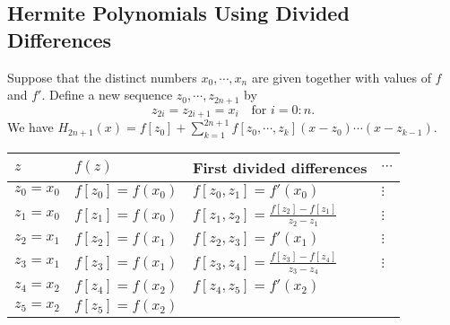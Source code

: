 \subsection{Hermite Polynomials Using Divided Differences}
Suppose that the distinct numbers $x_0,\cdots,x_n$ are given together with values of $f$ and $f'$. Define a new sequence $z_0,\cdots,z_{2n+1}$ by
\[
z_{2i} = z_{2i+1} = x_i\quad\text{for $i=0:n$}.
\]
We have $H_{2n+1}(x)=f[z_0]+\sum_{k=1}^{2n+1}f[z_0,\cdots,z_k](x-z_0)\cdots(x-z_{k-1})$.
\vspace{1cm}\\
\begin{tabular}{@{}llll@{}}
\toprule
$z$ & $f(z)$ & First divided differences & $\cdots$ \\ \midrule
$z_0=x_0$ & $f[z_0]=f(x_0)$ & $f[z_0,z_1]=f'(x_0)$ & $\vdots$ \\
$z_1=x_0$ & $f[z_1]=f(x_0)$ & $f[z_1,z_2]=\frac{f[z_2]-f[z_1]}{z_2-z_1}$ & $\vdots$ \\
$z_2=x_1$ & $f[z_2]=f(x_1)$ & $f[z_2,z_3]=f'(x_1)$ & $\vdots$ \\
$z_3=x_1$ & $f[z_3]=f(x_1)$ & $f[z_3,z_4]=\frac{f[z_3]-f[z_4]}{z_3-z_4}$ & $\vdots$ \\
$z_4=x_2$ & $f[z_4]=f(x_2)$ & $f[z_4,z_5]=f'(x_2)$ &  \\
$z_5=x_2$ & $f[z_5]=f(x_2)$ &  &  \\ \bottomrule
\end{tabular}
